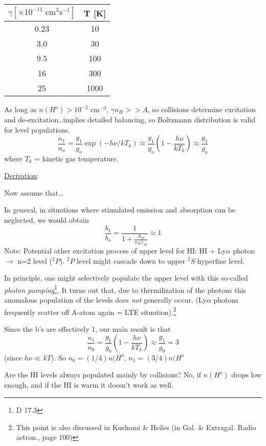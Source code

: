 \documentclass[11pt]{article}
\newcommand{\mar}[1]{\hspace{0pt}\marginpar{-\textcolor{black}{#1}-}}
\begin{document}
\begin{center}
    \begin{tabular}{c c}
        $\gamma [\times10^{-11}\;\mathrm{cm}^{3}\mathrm{s}^{-1}]$ & T [K]\\
        \hline
        0.23 & 10\\
        3.0 & 30\\
        9.5 & 100\\
        16 & 300\\
        25 & 1000
    \end{tabular}
\end{center}
As long as $n(H^{o}) > 10^{-2}$ cm$^{-3}$, $\gamma n_{H} >> A$, so
collisions determine excitation and de-excitation\ldots implies
detailed balancing, so Boltzmann distribution is valid for level
populations.
\[
    \frac{n_{1}}{n_{o}} = \frac{g_{1}}{g_{o}}\exp(-h\nu/kT_{k})
    \approx \frac{g_{1}}{g_{o}}(1-\frac{h\nu}{kT_{k}}) \approx \frac{g_{1}}{g_{o}}
    \]
where $T_{k}$ = kinetic gas temperature.


\underline{Derivation}:\mar{35}

Now\mar{36} assume that\ldots

In general, in situations where stimulated emission and absorption can
be neglected, we would obtain
\[
    \frac{b_{1}}{b_{o}} = \frac{1}{1 + \frac{A_{10}}{n_{H}\gamma_{10}}}
    \approx 1
    \]
Note: Potential other excitation process of upper level for HI:
HI + Ly$\alpha$ photon $\rightarrow$ n=2 level ($^{2}P$). $^{2}P$ level might cascade
down to upper $^{2}S$ hyperfine level.

In principle, one might selectively populate the upper level with this
so-called \textit{photon pumping}\footnote{D 17.3}.
It turns out that, due to thermilization of the photons this anomalous
population of the levels does \emph{not} generally occur. (Ly$\alpha$ photons
frequently scatter off A-atom again = LTE situation).\footnote{
    This point is also discussed in Kushami \& Heiles (in Gal. \&
    Extragal. Radio astron., page 100)}

\mar{37}Since the b's are effectively 1, our \textcolor{bred}{main result}
is that
\[
    \frac{n_{1}}{n_{0}}
    = \frac{g_{1}}{g_{0}} \left( 1 - \frac{h\nu}{kT_{k}} \right)
    \approx \frac{g_{1}}{g_{0}} = 3
    \]
(since $h\nu \ll kT$). So $n_{0} = (1/4)n(H^{o}$, $n_{1} = (3/4)n(H^{o}$

Are the HI levels always populated mainly by collisions? No, if $n(H^{o})$ drops
low enough, and if the HI is warm it doesn't work as well.
\end{document}
